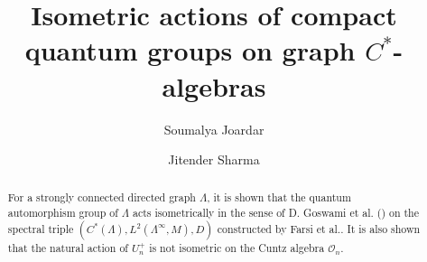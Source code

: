 \documentclass{amsart}
\theoremstyle{plain}
\theoremstyle{definition}
\theoremstyle{remark}
\numberwithin{equation}{section}
\newcommand{\cal}{\mathcal}
\newcommand{\clo}{{\cal O}}
\begin{document}
 
\title[]{Isometric actions of compact quantum groups on graph $C^{\ast}$-algebras}
\author[Joardar]{Soumalya Joardar}
\address{Department of Mathematics and Statistics, Indian Institute of Science Education and Research Kolkata, Mohanpur - 741246, West
	Bengal, India}
\author[Sharma]{Jitender Sharma}
\address{Department of Mathematics and Statistics, Indian Institute of Science Education and Research Kolkata, Mohanpur - 741246, West
	Bengal, India}

\begin{abstract}
For a strongly connected directed graph $\Lambda$, it is shown that the quantum automorphism group of $\Lambda$ acts isometrically in the sense of D. Goswami et al. (\cite{goswami1}) on the spectral triple $(C^{\ast}(\Lambda), L^{2}(\Lambda^{\infty},M),D)$ constructed by Farsi et al.. It is also shown that the natural action of $U_{n}^{+}$ is not isometric on the Cuntz algebra $\clo_{n}$.
\end{abstract}
\maketitle
\end{document}
